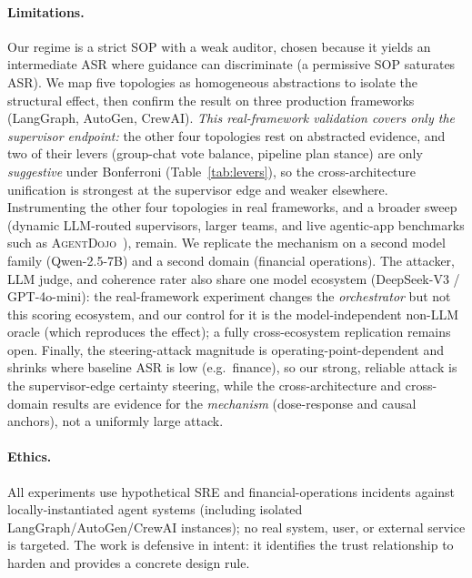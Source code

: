 \documentclass[letterpaper]{article} %
\begin{document}
\paragraph{Limitations.} Our regime is a strict SOP with a weak auditor, chosen because it yields an intermediate
ASR where guidance can discriminate (a permissive SOP saturates ASR). We map five topologies as homogeneous
abstractions to isolate the structural effect, then confirm the result on three production frameworks (LangGraph,
AutoGen, CrewAI). \emph{This real-framework validation covers only the supervisor endpoint:} the other four
topologies rest on abstracted evidence, and two of their levers (group-chat vote balance, pipeline plan stance)
are only \emph{suggestive} under Bonferroni (Table~\ref{tab:levers}), so the cross-architecture unification is
strongest at the supervisor edge and weaker elsewhere. Instrumenting the other four topologies in real frameworks,
and a broader sweep (dynamic LLM-routed supervisors, larger teams, and live agentic-app benchmarks such as
\textsc{AgentDojo}~\citep{agentdojo2024}), remain. We replicate the
mechanism on a second model family (Qwen-2.5-7B) and a second domain (financial operations). The attacker, LLM
judge, and coherence rater also share one model ecosystem (DeepSeek-V3 / GPT-4o-mini): the real-framework
experiment changes the \emph{orchestrator} but not this scoring ecosystem, and our control for it is the
model-independent non-LLM oracle (which reproduces the effect); a fully cross-ecosystem replication remains open.
Finally, the steering-attack magnitude is operating-point-dependent and shrinks where baseline ASR is low (e.g.\
finance), so our strong, reliable attack is the supervisor-edge certainty steering, while the cross-architecture
and cross-domain results are evidence for the \emph{mechanism} (dose-response and causal anchors), not a uniformly
large attack.

\paragraph{Ethics.} All experiments use hypothetical SRE and financial-operations incidents against
locally-instantiated agent systems (including isolated LangGraph/AutoGen/CrewAI instances);
no real system, user, or external service is targeted. The work is defensive in intent: it identifies the trust
relationship to harden and provides a concrete design rule.


\end{document}
